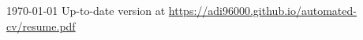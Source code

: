 \documentclass[11pt, a4paper]{awesome-cv}
\begin{document}
\makecvheader[C]

\makecvfooter
{\today}
{Up-to-date version at \upshape\color{text}\url{https://adi96000.github.io/automated-cv/resume.pdf}}
{\thepage}



\medskip
\vspace{1em}

\clearpage


\medskip

\end{document}

